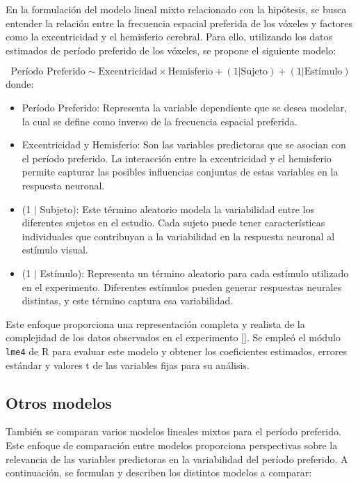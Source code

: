 En la formulación del modelo lineal mixto relacionado con la hip\'otesis, se busca entender la relación entre la frecuencia espacial preferida de los vóxeles y factores como la excentricidad y el hemisferio cerebral. Para ello, utilizando los datos estimados de per\'iodo preferido de los v\'oxeles, se propone el siguiente modelo:

\begin{equation}
	\text{Período Preferido} \sim  \text{Excentricidad} \times \text{Hemisferio} + (1 | \text{Sujeto}) + (1 | \text{Estímulo})	
	\label{mlm_pp}
\end{equation}
donde:
\begin{itemize}
	\item Período Preferido: Representa la variable dependiente que se desea modelar, la cual se define como inverso de la frecuencia espacial preferida.
	
	\item Excentricidad y Hemisferio: Son las variables predictoras que se asocian con el período preferido. La interacción entre la excentricidad y el hemisferio permite capturar las posibles influencias conjuntas de estas variables en la respuesta neuronal.
	
	\item (1 $|$ Subjeto): Este término aleatorio modela la variabilidad entre los diferentes sujetos en el estudio. Cada sujeto puede tener características individuales que contribuyan a la variabilidad en la respuesta neuronal al estímulo visual.

	\item (1 $|$ Est\'imulo): Representa un término aleatorio para cada estímulo utilizado en el experimento. Diferentes estímulos pueden generar respuestas neurales distintas, y este término captura esa variabilidad.
	
\end{itemize}

Este enfoque proporciona una representación completa y realista de la complejidad de los datos observados en el experimento [\cite{broderick_mapping_2022}]. Se empleó el módulo \texttt{lme4} de R para evaluar este modelo y obtener los coeficientes estimados, errores estándar y valores t de las variables fijas para su análisis.


\subsection{Otros modelos} \label{compare_mlm}

Tambi\'en se comparan varios modelos lineales mixtos para el período preferido. Este enfoque de comparación entre modelos proporciona perspectivas sobre la relevancia de las variables predictoras en la variabilidad del período preferido. A continuación, se formulan y describen los distintos modelos a comparar:


